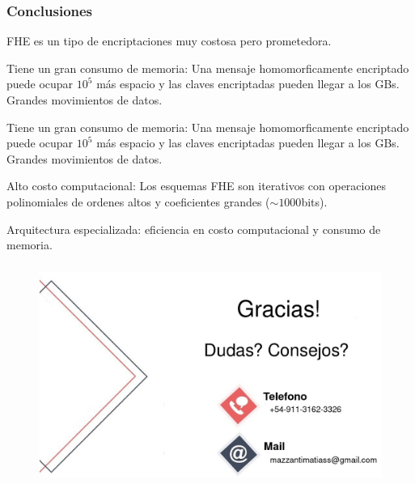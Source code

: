 \documentclass[10pt]{beamer}
\begin{document}
\begin{frame}
\frametitle{Conclusiones}
FHE es un tipo de encriptaciones muy costosa pero prometedora.


\pause
Tiene un gran consumo de memoria:
\pause
Una mensaje homomorficamente encriptado puede ocupar $10^5$ más espacio y las claves encriptadas pueden llegar a los GBs.
Grandes movimientos de datos.

\pause
Tiene un gran consumo de memoria:
\pause
Una mensaje homomorficamente encriptado puede ocupar $10^5$ más espacio y las claves encriptadas pueden llegar a los GBs.
Grandes movimientos de datos.

Alto costo computacional:
\pause
  Los esquemas FHE son iterativos con operaciones polinomiales de ordenes altos y coeficientes grandes ($\sim 1000$bits).

\pause
\begin{mdframed}[backgroundcolor=frenchblue!20]
  Arquitectura especializada: eficiencia en costo computacional y consumo de memoria.
\end{mdframed}

\end{frame}

\begin{frame}
\frametitle{}
  \begin{figure}[h!]
      \centering
      \includegraphics[scale=0.3]{agradecimientos.jpg}
  \end{figure}
\end{frame}
\end{document}
